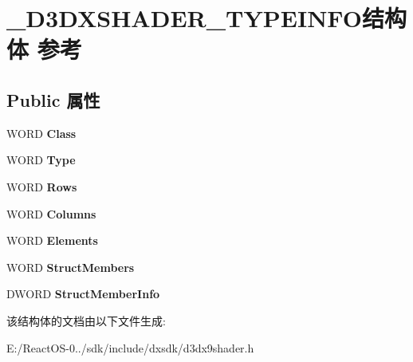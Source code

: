 \hypertarget{struct___d3_d_x_s_h_a_d_e_r___t_y_p_e_i_n_f_o}{}\section{\+\_\+\+D3\+D\+X\+S\+H\+A\+D\+E\+R\+\_\+\+T\+Y\+P\+E\+I\+N\+F\+O结构体 参考}
\label{struct___d3_d_x_s_h_a_d_e_r___t_y_p_e_i_n_f_o}
\subsection*{Public 属性}
\begin{DoxyCompactItemize}
\item 
\mbox{\label{struct___d3_d_x_s_h_a_d_e_r___t_y_p_e_i_n_f_o_ac71221bef369a426dd962f153a1b3e12}} 
W\+O\+RD {\bfseries Class}
\item 
\mbox{\label{struct___d3_d_x_s_h_a_d_e_r___t_y_p_e_i_n_f_o_acfaff3ab6fa9324c28bec8bb3b585491}} 
W\+O\+RD {\bfseries Type}
\item 
\mbox{\label{struct___d3_d_x_s_h_a_d_e_r___t_y_p_e_i_n_f_o_a3e65553c728c2d293c1b49ddc6093603}} 
W\+O\+RD {\bfseries Rows}
\item 
\mbox{\label{struct___d3_d_x_s_h_a_d_e_r___t_y_p_e_i_n_f_o_a764daaf68ad852f94ff4d12f93d439e1}} 
W\+O\+RD {\bfseries Columns}
\item 
\mbox{\label{struct___d3_d_x_s_h_a_d_e_r___t_y_p_e_i_n_f_o_a898cbf3f6f08c87a2eb26525f51b339b}} 
W\+O\+RD {\bfseries Elements}
\item 
\mbox{\label{struct___d3_d_x_s_h_a_d_e_r___t_y_p_e_i_n_f_o_acd58806bb4bd39f2f77a0e91803ab452}} 
W\+O\+RD {\bfseries Struct\+Members}
\item 
\mbox{\label{struct___d3_d_x_s_h_a_d_e_r___t_y_p_e_i_n_f_o_a8d6dc1ac9aff332fa7d07433190dd70f}} 
D\+W\+O\+RD {\bfseries Struct\+Member\+Info}
\end{DoxyCompactItemize}


该结构体的文档由以下文件生成\+:\begin{DoxyCompactItemize}
\item 
E\+:/\+React\+O\+S-\/0../sdk/include/dxsdk/d3dx9shader.\+h\end{DoxyCompactItemize}
